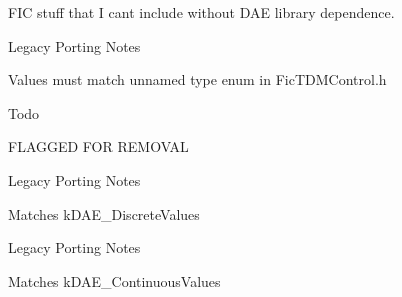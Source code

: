 F\+I\+C stuff that I can\textquotesingle{}t include without D\+A\+E library dependence. 

\begin{DoxyRefDesc}{Legacy Porting Notes}
\item[\hyperlink{a00384__porting_notes000010}{Legacy Porting Notes}]Values must match unnamed type enum in Fic\+T\+D\+M\+Control.\+h\end{DoxyRefDesc}


\begin{DoxyRefDesc}{Todo}
\item[\hyperlink{a00382__todo000028}{Todo}]F\+L\+A\+G\+G\+E\+D F\+O\+R R\+E\+M\+O\+V\+A\+L\end{DoxyRefDesc}
\begin{Desc}
\item[Enumerator]\par
\begin{description}
\item[{\em 
\hypertarget{a00206_a4cd0f189daa9a60cf36883c56344bb2ea2a3c9939ef1fa8b8f729152c35c42740}{}A\+A\+X\+\_\+e\+Parameter\+Type\+\_\+\+Discrete\label{a00206_a4cd0f189daa9a60cf36883c56344bb2ea2a3c9939ef1fa8b8f729152c35c42740}
}]\begin{DoxyRefDesc}{Legacy Porting Notes}
\item[\hyperlink{a00384__porting_notes000022}{Legacy Porting Notes}]Matches {\ttfamily k\+D\+A\+E\+\_\+\+Discrete\+Values} \end{DoxyRefDesc}
\item[{\em 
\hypertarget{a00206_a4cd0f189daa9a60cf36883c56344bb2eade82e7d1b5012a76837b70c1a9b92168}{}A\+A\+X\+\_\+e\+Parameter\+Type\+\_\+\+Continuous\label{a00206_a4cd0f189daa9a60cf36883c56344bb2eade82e7d1b5012a76837b70c1a9b92168}
}]\begin{DoxyRefDesc}{Legacy Porting Notes}
\item[\hyperlink{a00384__porting_notes000023}{Legacy Porting Notes}]Matches {\ttfamily k\+D\+A\+E\+\_\+\+Continuous\+Values} \end{DoxyRefDesc}
\end{description}
\end{Desc}
\hypertarget{a00206_aa5ffa1ed828630b6b7a13c049d93ae87}{}
